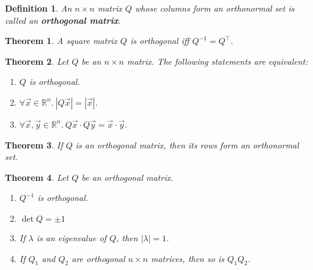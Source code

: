\documentclass{article}
\theoremstyle{sltheorem}
\newtheorem{definition}{Definition}[section]
\newtheorem{theorem}{Theorem}[section]
\begin{document}
\begin{definition}
    An $n \times n$ matrix $Q$ whose columns form an orthonormal set is called an \linebreak \textbf{orthogonal matrix}.
\end{definition}
\begin{theorem}
    A square matrix $Q$ is orthogonal iff $Q^{-1}=Q^\intercal $.
\end{theorem}
\begin{theorem}
    Let $Q$ be an $n\times n$ matrix. The following statements are equivalent:
    \begin{enumerate}
        \item $Q$ is orthogonal.
        \item $\forall \vec x \in \mathbb{R}^n.\:|Q\vec x| = |\vec x|$.
        \item $\forall \vec x, \vec y \in \mathbb{R}^n.\:Q\vec x\cdot Q\vec y = \vec x\cdot \vec y$.
    \end{enumerate}
\end{theorem}
\begin{theorem}
    If $Q$ is an orthogonal matrix, then its rows form an orthonormal set.
\end{theorem}
\begin{theorem}
    Let $Q$ be an orthogonal matrix.
    \begin{enumerate}
        \item $Q^{-1}$ is orthogonal.
        \item $\det Q = \pm 1$
        \item If $\lambda$ is an eigenvalue of $Q$, then $|\lambda|=1$.
        \item If $Q_1$ and $Q_2$ are orthogonal $n\times n$ matrices, then so is $Q_1Q_2$.
    \end{enumerate}
\end{theorem}
\end{document}
